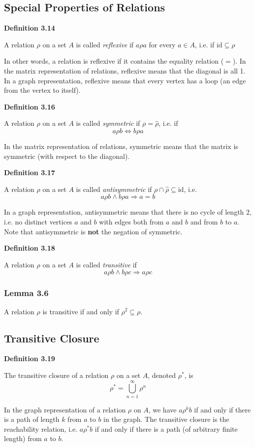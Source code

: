 \documentclass[a4paper]{report}
\newenvironment{definition}[1]{\begin{framed}\centerline{\textbf{Definition #1}}\noindent\hspace{-1.1mm}}{\end{framed}}
\begin{document}
\subsection{Special Properties of Relations}
\begin{definition}{3.14}
A relation $\rho$ on a set $A$ is called \emph{reflexive} if $a\rho a$ for every $a\in A$, i.e. if $\text{id}\subseteq\rho$
\end{definition}
In other words, a relation is reflexive if it contains the equality relation ($=$). In the matrix representation of relations, reflexive means that the diagonal is all 1. In a graph representation, reflexive means that every vertex has a loop (an edge from the vertex to itself).

\begin{definition}{3.16}
A relation $\rho$ on a set $A$ is called \emph{symmetric} if $\rho=\widehat{\rho}$, i.e. if \[a\rho b\Longleftrightarrow b\rho a\]
\end{definition}
In the matrix representation of relations, symmetric means that the matrix is symmetric (with respect to the diagonal).

\begin{definition}{3.17}
A relation $\rho$ on a set $A$ is called \emph{antisymmetric} if $\rho\cap\widehat{\rho}\subseteq\text{id}$, i.e. \[a\rho b\land b\rho a\Longrightarrow a=b\]
\end{definition}
In a graph representation, antisymmetric means that there is no cycle of length 2, i.e. no distinct vertices $a$ and $b$ with edges both from $a$ and $b$ and from $b$ to $a$. Note that antisymmetric is \textbf{not} the negation of symmetric. 

\begin{definition}{3.18}
A relation $\rho$ on a set $A$ is called \emph{transitive} if \[a\rho b\land b\rho c\Longrightarrow a\rho c\]
\end{definition}

\subsubsection*{Lemma 3.6}
A relation $\rho$ is transitive if and only if $\rho^2\subseteq\rho$.

\subsection{Transitive Closure}
\begin{definition}{3.19}
The transitive closure of a relation $\rho$ on a set $A$, denoted $\rho^*$, is \[{\rho ^*} = \bigcup\limits_{n = 1}^\infty  {{\rho ^n}} \]
\end{definition}
In the graph representation of a relation $\rho$ on $A$, we have $a\rho^k b$ if and only if there is a path of length $k$ from $a$ to $b$ in the graph. The transitive closure is the reachability relation, i.e. $a\rho^* b$ if and only if there is a path (of arbitrary finite length) from $a$ to $b$.
\end{document}
